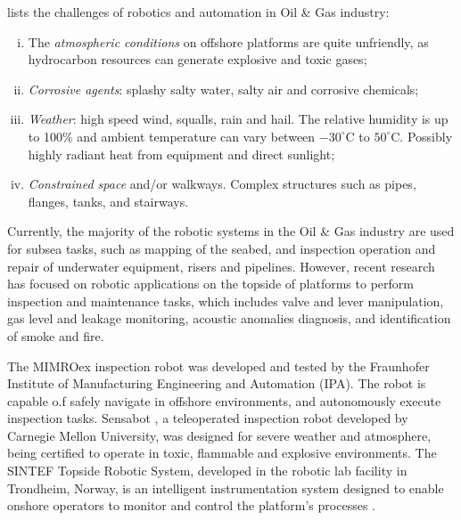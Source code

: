 lists the challenges of robotics and automation in Oil
\& Gas industry:%

\begin{enumerate}[i)]
\item The \emph{atmospheric conditions} on offshore platforms are quite unfriendly, as
hydrocarbon resources can generate explosive and toxic gases;\\ %
\item \emph{Corrosive agents}: splashy salty water, salty air and corrosive chemicals;\\
\item \emph{Weather}: high speed wind, squalls, rain and hail. The relative humidity is up to
100\% and ambient temperature can vary between $-30^{\circ}$C to $50^{\circ}$C. Possibly highly radiant heat from equipment and direct sunlight;\\
\item \emph{Constrained space} and/or walkways. Complex structures such as pipes,
flanges, tanks, and stairways.
\end{enumerate}


Currently, the majority of the robotic systems in the Oil \& Gas industry are
used for subsea tasks, such as mapping of the seabed, and inspection operation
and repair of underwater equipment, risers and pipelines. However, recent research has focused on robotic applications on the topside of platforms to perform inspection and maintenance tasks, which includes valve and lever manipulation, gas level and leakage monitoring, acoustic anomalies diagnosis, and identification of smoke and fire.

The MIMROex inspection robot  was developed and
tested by the Fraunhofer Institute of Manufacturing Engineering and Automation
(IPA). The robot is capable o.f safely navigate in offshore environments, and
autonomously execute inspection tasks. Sensabot , a
teleoperated inspection robot developed by Carnegie Mellon University, was
designed for severe weather and atmosphere, being certified to operate in toxic, flammable and explosive environments. The SINTEF Topside Robotic System, developed in the robotic lab facility in
Trondheim, Norway, is an intelligent instrumentation system designed to enable onshore operators
to monitor and control the platform's processes .


